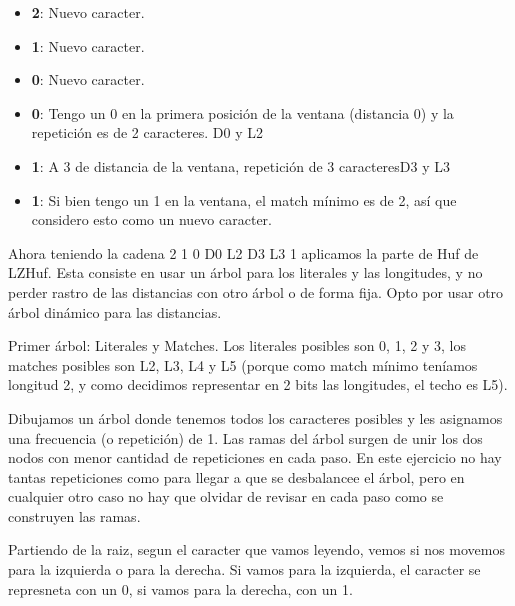 \documentclass[a4paper]{article}
\begin{document}
    \begin{itemize}
        \item \textbf{2}: Nuevo caracter.
        \item \textbf{1}: Nuevo caracter.
        \item \textbf{0}: Nuevo caracter.
        \item \textbf{0}: Tengo un 0 en la primera posición de la ventana (distancia 0) y la repetición es de 2 caracteres. \textrightarrow D0 y L2
        \item \textbf{1}: A 3 de distancia de la ventana, repetición de 3 caracteres\textrightarrow D3 y L3
        \item \textbf{1}: Si bien tengo un 1 en la ventana, el match mínimo es de 2, así que considero esto como un nuevo caracter. 
    \end{itemize}

    Ahora teniendo la cadena 2 1 0 D0 L2 D3 L3 1 aplicamos la parte de Huf de LZHuf. Esta consiste en usar un árbol para los literales y las longitudes, y no perder rastro de las distancias con otro árbol o de forma fija. Opto por usar otro árbol dinámico para las distancias.

    Primer árbol: Literales y Matches. Los literales posibles son 0, 1, 2 y 3, los matches posibles son L2, L3, L4 y L5 (porque como match mínimo teníamos longitud 2, y como decidimos representar en 2 bits las longitudes, el techo es L5).

    Dibujamos un árbol donde tenemos todos los caracteres posibles y les asignamos una frecuencia (o repetición) de 1. Las ramas del árbol surgen de unir los dos nodos con menor cantidad de repeticiones en cada paso. En este ejercicio no hay tantas repeticiones como para llegar a que se desbalancee el árbol, pero en cualquier otro caso no hay que olvidar de revisar en cada paso como se construyen las ramas. 
    
    Partiendo de la raiz, segun el caracter que vamos leyendo, vemos si nos movemos para la izquierda o para la derecha. Si vamos para la izquierda, el caracter se represneta con un 0, si vamos para la derecha, con un 1.
\end{document}
